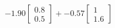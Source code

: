\documentclass[preview]{standalone}
\begin{document}
\begin{align*}
-1.90 \begin{bmatrix} 0.8 \\ 0.5 \end{bmatrix} + -0.57 \begin{bmatrix} 1 \\ 1.6 \end{bmatrix}
\end{align*}
\end{document}
